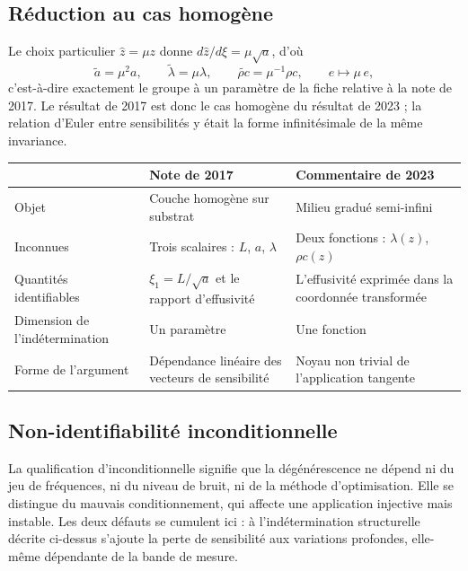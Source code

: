 \documentclass[11pt,a4paper]{article}
\begin{document}
\subsection{Réduction au cas homogène}

Le choix particulier $\hat z = \mu z$ donne $d\hat z/d\xi = \mu\sqrt{a}$, d'où
\[ \tilde a = \mu^{2}a , \qquad \tilde\lambda = \mu\lambda , \qquad
\widetilde{\rho c} = \mu^{-1}\rho c , \qquad e \mapsto \mu\,e , \]
c'est-à-dire exactement le groupe à un paramètre de la fiche relative à la note de 2017. Le résultat de
2017 est donc le cas homogène du résultat de 2023 ; la relation d'Euler entre sensibilités y était la
forme infinitésimale de la même invariance.

\begin{center}
\begin{tabularx}{\textwidth}{@{}lXX@{}}
\toprule
& \textbf{Note de 2017} & \textbf{Commentaire de 2023} \\
\midrule
Objet & Couche homogène sur substrat & Milieu gradué semi-infini \\
\addlinespace
Inconnues & Trois scalaires : $L$, $a$, $\lambda$ & Deux fonctions : $\lambda(z)$, $\rho c(z)$ \\
\addlinespace
Quantités identifiables & $\xi_{1}=L/\sqrt{a}$ et le rapport d'effusivité & L'effusivité exprimée dans
la coordonnée transformée \\
\addlinespace
Dimension de l'indétermination & Un paramètre & Une fonction \\
\addlinespace
Forme de l'argument & Dépendance linéaire des vecteurs de sensibilité & Noyau non trivial de
l'application tangente \\
\bottomrule
\end{tabularx}
\end{center}

\subsection{Non-identifiabilité inconditionnelle}

La qualification d'inconditionnelle signifie que la dégénérescence ne dépend ni du jeu de fréquences,
ni du niveau de bruit, ni de la méthode d'optimisation. Elle se distingue du mauvais conditionnement,
qui affecte une application injective mais instable. Les deux défauts se cumulent ici : à
l'indétermination structurelle décrite ci-dessus s'ajoute la perte de sensibilité aux variations
profondes, elle-même dépendante de la bande de mesure.
\end{document}
